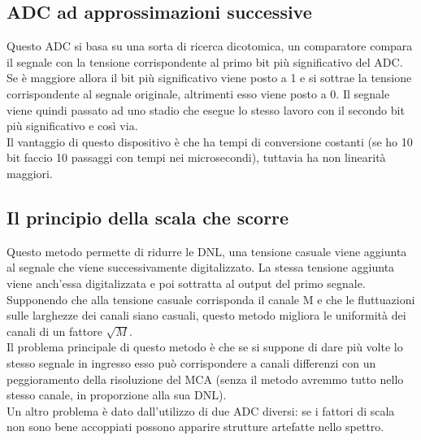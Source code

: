 \subsection{ADC ad approssimazioni successive}
Questo ADC si basa su una sorta di ricerca dicotomica, un comparatore compara il segnale con la tensione corrispondente al 
primo bit pi\`u significativo del ADC. 
Se \`e maggiore allora il bit pi\`u significativo viene posto a 1 e si sottrae la tensione corrispondente al segnale originale, altrimenti esso viene posto a 0.
Il segnale viene quindi passato ad uno stadio che esegue lo stesso lavoro con il secondo bit pi\`u significativo e cos\`i via.\\
Il vantaggio di questo dispositivo \`e che ha tempi di conversione costanti (se ho 10 bit faccio 10 passaggi con tempi nei microsecondi), tuttavia ha non linearit\`a maggiori.
\subsection{Il principio della scala che scorre}
Questo metodo permette di ridurre le DNL, una tensione casuale viene aggiunta al segnale che viene successivamente digitalizzato.
La stessa tensione aggiunta viene anch'essa digitalizzata e poi sottratta al output del primo segnale.
Supponendo che alla tensione casuale corrisponda il canale M e che le fluttuazioni sulle larghezze dei canali siano casuali, questo metodo
migliora le uniformit\`a dei canali di un fattore $\sqrt{M}$.\\
Il problema principale di questo metodo \`e che se si suppone di dare pi\`u volte lo stesso segnale in ingresso esso pu\`o corrispondere a canali differenzi
con un peggioramento della risoluzione del MCA (senza il metodo avremmo tutto nello stesso canale, in proporzione alla sua DNL).\\
Un altro problema \`e dato dall'utilizzo di due ADC diversi: se i fattori di scala non sono bene accoppiati possono apparire strutture artefatte nello spettro.
